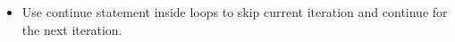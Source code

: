 \setlength{\columnsep}{3pt}
\begin{flushleft}

	\begin{itemize}
		\item Use continue statement inside loops to skip current iteration and continue for the next iteration.
		\bigskip
		
	\end{itemize}

\end{flushleft}
\newpage

